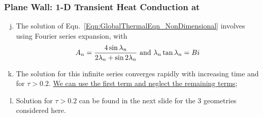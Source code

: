 \documentclass[10pt,compress,unknownkeysallowed]{beamer}
\begin{document}
\begin{frame}
 \frametitle{Plane Wall: 1-D Transient Heat Conduction at  }
   \begin{enumerate}[(a)]\setcounter{enumi}{9}%
     \item<1-> The solution of Eqn.~\ref{Eqn:GlobalThermalEqn_NonDimensional} involves using Fourier series expansion,
          with
          \begin{displaymath}
            A_{n} = \displaystyle\frac{4\sin{\lambda_{n}}}{2\lambda_{n}+\sin{2\lambda_{n}}}\text{ and } \lambda_{n}\tan{\lambda_{n}} = Bi
          \end{displaymath}
     \item<2-> The solution for this infinite series converges rapidly with increasing time and for $\tau > 0.2$. \underline{We can use the first term and neglect the remaining terms}; 
     \item<3-> Solution for $\tau>0.2$ can be found in the next slide for the 3 geometries considered here.

   \end{enumerate} 
\end{frame}
\end{document}
